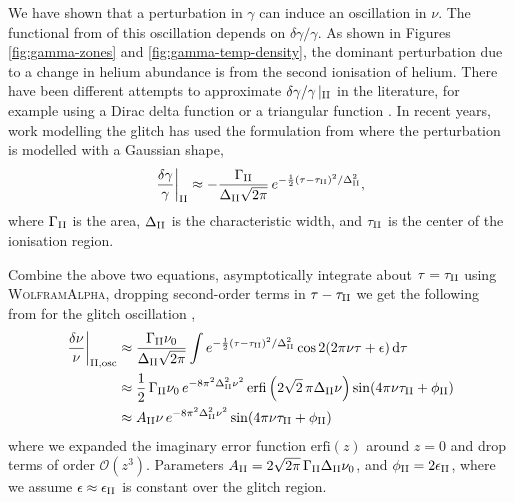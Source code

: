 We have shown that a perturbation in \(\gamma\) can induce an oscillation in \(\nu\). The functional from of this oscillation depends on \(\delta\gamma/\gamma\). As shown in Figures \ref{fig:gamma-zones} and \ref{fig:gamma-temp-density}, the dominant perturbation due to a change in helium abundance is from the second ionisation of helium. There have been different attempts to approximate \(\delta\gamma/\gamma\,|_{{\mathrm{II}}}\) in the literature, for example using a Dirac delta function or a triangular function \citep{Monteiro.Christensen-Dalsgaard.ea1994, Monteiro.Thompson2005}. In recent years, work modelling the glitch has used the formulation from \citet{Houdek.Gough2007} where the perturbation is modelled with a Gaussian shape,
%
\begin{equation}
    \left.\frac{\delta\gamma}{\gamma}\right|_{{\mathrm{II}}} \approx - \frac{\Gamma_{{\mathrm{II}}}}{\Delta_{{\mathrm{II}}} \sqrt{2\pi}} \, e^{- \frac12{(\tau - \tau_{{\mathrm{II}}})^2}/{\Delta_{{\mathrm{II}}}^2} },
\end{equation}
%
where \(\Gamma_{{\mathrm{II}}}\) is the area, \(\Delta_{{\mathrm{II}}}\) is the characteristic width, and \(\tau_{{\mathrm{II}}}\) is the center of the ionisation region.

Combine the above two equations, asymptotically integrate about \(\tau = \tau_{{\mathrm{II}}}\) using \textsc{WolframAlpha}, dropping second-order terms in \(\tau - \tau_{{\mathrm{II}}}\) we get the following from for the glitch oscillation \citep[cf.][]{Houdek.Gough2007},
%
\begin{align}
    \left.\frac{\delta\nu}{\nu}\right|_{{\mathrm{II}}, \mathrm{osc}} &\approx \frac{\Gamma_{{\mathrm{II}}} \nu_0}{\Delta_{{\mathrm{II}}} \sqrt{2\pi}} \int e^{- \frac12{(\tau - \tau_{{\mathrm{II}}})^2}/{\Delta_{{\mathrm{II}}}^2} } \cos 2 (2 \pi \nu \tau + \epsilon) \, \mathrm{d} \tau \notag \\
    &\approx \frac12 \, {\Gamma_{{\mathrm{II}}} \nu_0} \, e^{- 8 \pi^2 \Delta_{{\mathrm{II}}}^2 \nu^2} \, \mathrm{erfi}\left(2\sqrt{2}\,\pi\Delta_{{\mathrm{II}}}\nu\right) \sin(4 \pi \nu \tau_{{\mathrm{II}}} + \phi_{{\mathrm{II}}}) \notag\\
    &\approx A_{{\mathrm{II}}} \nu \, e^{- 8 \pi^2 \Delta_{{\mathrm{II}}}^2 \nu^2} \sin(4 \pi \nu \tau_{{\mathrm{II}}} + \phi_{{\mathrm{II}}})
\end{align}
%
where we expanded the imaginary error function \(\mathrm{erfi}(z)\) around \(z=0\) and drop terms of order \(\mathcal{O}(z^3)\). Parameters \(A_{{\mathrm{II}}} = 2 \sqrt{2\pi} \, \Gamma_{{\mathrm{II}}} \Delta_{{\mathrm{II}}} \nu_0\), and \(\phi_{{\mathrm{II}}} = 2\epsilon_{{\mathrm{II}}}\), where we assume \(\epsilon \approx \epsilon_{{\mathrm{II}}}\) is constant over the glitch region.

